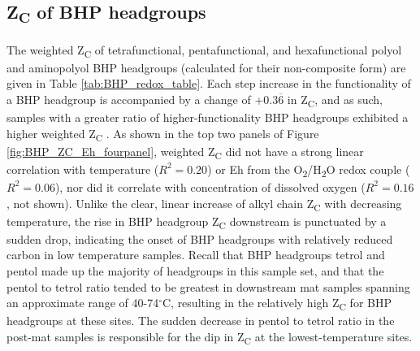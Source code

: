 \subsection{Z\textsubscript{C} of BHP headgroups}

The weighted Z\textsubscript{C} of tetrafunctional, pentafunctional, and hexafunctional polyol and aminopolyol BHP headgroups (calculated for their non-composite form) are given in Table \ref{tab:BHP_redox_table}. Each step increase in the functionality of a BHP headgroup is accompanied by a change of +$0.3\overline{6}$ in Z\textsubscript{C}, and as such, samples with a greater ratio of higher-functionality BHP headgroups exhibited a higher weighted Z\textsubscript{C} . As shown in the top two panels of Figure \ref{fig:BHP_ZC_Eh_fourpanel}, weighted Z\textsubscript{C} did not have a strong linear correlation with temperature ($R^{2} = 0.20$) or Eh from the O\textsubscript{2}/H\textsubscript{2}O redox couple ($R^{2} = 0.06$), nor did it correlate with concentration of dissolved oxygen ($R^{2} = 0.16$, not shown). Unlike the clear, linear increase of alkyl chain Z\textsubscript{C} with decreasing temperature, the rise in BHP headgroup Z\textsubscript{C} downstream is punctuated by a sudden drop, indicating the onset of BHP headgroups with relatively reduced carbon in low temperature samples. Recall that BHP headgroups tetrol and pentol made up the majority of headgroups in this sample set, and that the pentol to tetrol ratio tended to be greatest in downstream mat samples spanning an approximate range of 40-74$^{\circ}$C, resulting in the relatively high Z\textsubscript{C} for BHP headgroups at these sites. The sudden decrease in pentol to tetrol ratio in the post-mat samples is responsible for the dip in Z\textsubscript{C} at the lowest-temperature sites.

